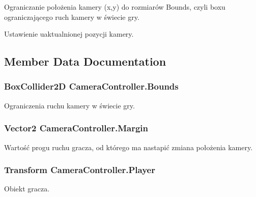 Ograniczanie położenia kamery (x,y) do rozmiarów Bounds, czyli boxu ograniczającego ruch kamery w świecie gry.

Ustawienie uaktualnionej pozycji kamery. 

\subsection{Member Data Documentation}
\hypertarget{class_camera_controller_aad472aa9d9410f6b05884b0d4d336d45}{}
\subsubsection[{Bounds}]{\setlength{\rightskip}{0pt plus 5cm}Box\+Collider2\+D Camera\+Controller.\+Bounds}\label{class_camera_controller_aad472aa9d9410f6b05884b0d4d336d45}


Ograniczenia ruchu kamery w świecie gry. 

\hypertarget{class_camera_controller_a8c93ba738eeff2eb5af4bc2bc4ec3f10}{}
\subsubsection[{Margin}]{\setlength{\rightskip}{0pt plus 5cm}Vector2 Camera\+Controller.\+Margin}\label{class_camera_controller_a8c93ba738eeff2eb5af4bc2bc4ec3f10}


Wartość progu ruchu gracza, od którego ma nastapić zmiana położenia kamery. 

\hypertarget{class_camera_controller_a0028f1f6c8d940c36cfb6f6ea77b8658}{}
\subsubsection[{Player}]{\setlength{\rightskip}{0pt plus 5cm}Transform Camera\+Controller.\+Player}\label{class_camera_controller_a0028f1f6c8d940c36cfb6f6ea77b8658}


Obiekt gracza. 

\hypertarget{class_camera_controller_aaa266990dfb97f6e19d4dd6489f683ef}{}
